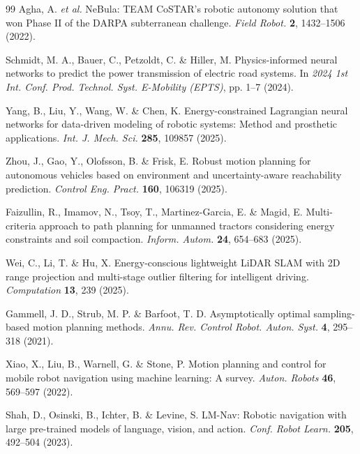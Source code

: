 \documentclass[pdflatex,sn-nature]{sn-jnl}%
\begin{document}
\begin{thebibliography}{99}
Agha, A. \textit{et al.} NeBula: {TEAM} {CoSTAR's} robotic autonomy solution that won {Phase II} of the {DARPA} subterranean challenge.
\emph{Field Robot.} \textbf{2}, 1432--1506 (2022).


Schmidt, M. A., Bauer, C., Petzoldt, C. \& Hiller, M. Physics-informed neural networks to predict the power transmission of electric road systems.
In \emph{2024 1st Int. Conf. Prod. Technol. Syst. E-Mobility (EPTS)},
pp. 1--7 (2024).


Yang, B., Liu, Y., Wang, W. \& Chen, K. Energy-constrained Lagrangian neural networks for data-driven modeling of robotic systems: Method and prosthetic applications.
\emph{Int. J. Mech. Sci.} \textbf{285}, 109857 (2025).

Zhou, J., Gao, Y., Olofsson, B. \& Frisk, E. Robust motion planning for autonomous vehicles based on environment and uncertainty-aware reachability prediction.
\emph{Control Eng. Pract.} \textbf{160}, 106319 (2025).

Faizullin, R., Imamov, N., Tsoy, T., Martinez-Garcia, E. \& Magid, E. Multi-criteria approach to path planning for unmanned tractors considering energy constraints and soil compaction.
\emph{Inform. Autom.} \textbf{24}, 654--683 (2025).

Wei, C., Li, T. \& Hu, X. Energy-conscious lightweight LiDAR SLAM with 2D range projection and multi-stage outlier filtering for intelligent driving.
\emph{Computation} \textbf{13}, 239 (2025).



Gammell, J. D., Strub, M. P. \& Barfoot, T. D. Asymptotically optimal sampling-based motion planning methods. \textit{Annu. Rev. Control Robot. Auton. Syst.} \textbf{4}, 295--318 (2021).

Xiao, X., Liu, B., Warnell, G. \& Stone, P. Motion planning and control for mobile robot navigation using machine learning: A survey. \textit{Auton. Robots} \textbf{46}, 569--597 (2022).

Shah, D., Osinski, B., Ichter, B. \& Levine, S. {LM-Nav}: Robotic navigation with large pre-trained models of language, vision, and action. \textit{Conf. Robot Learn.} \textbf{205}, 492--504 (2023).


\end{thebibliography}
\end{document}
